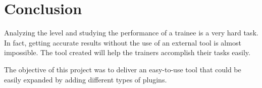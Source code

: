 \chapter{Conclusion}\label{chap:concl}
Analyzing the level and studying the performance of a trainee is a very hard task. In fact, getting accurate results without the use of an external tool is almost impossible. The tool created will help the trainers accomplish their tasks easily.

The objective of this project was to deliver an easy-to-use tool that could be easily expanded by adding different types of plugins.